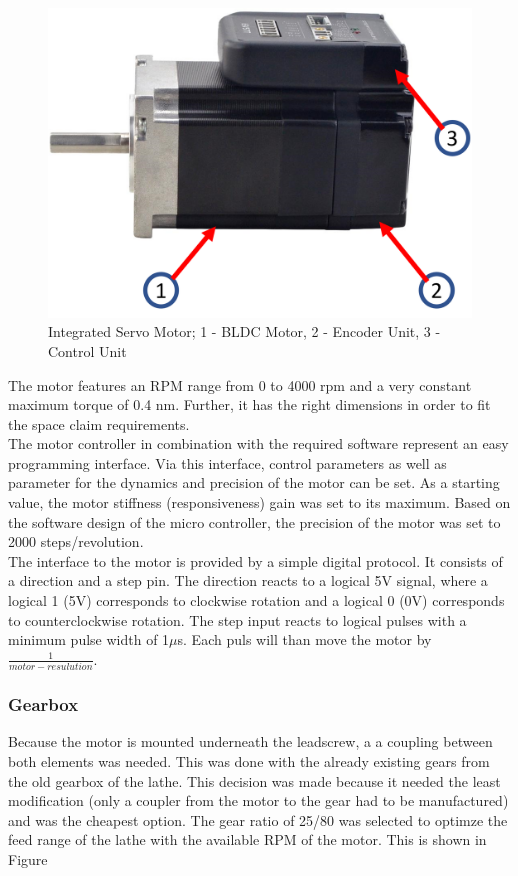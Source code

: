 \begin{figure}[h!]
    \begin{center}
    \includegraphics[width=12cm]{Pictures/IntegratedServo.png}
    \caption[Integrated Servo Motor]{Integrated Servo Motor; 1 - BLDC Motor, 2 - Encoder Unit, 3 - Control Unit}
    \label{Integrated Servo Motor}
    \end{center}
\end{figure}

The motor features an RPM range from 0 to 4000 rpm and a very constant maximum torque of 0.4 nm. Further, it has the right dimensions in order to fit the space claim requirements.\\
The motor controller in combination with the required software represent an easy programming interface. Via this interface, control parameters as well as parameter for the dynamics and precision of the motor can be set. As a starting value, the motor stiffness (responsiveness) gain was set to its maximum. Based on the software design of the micro controller, the precision of the motor was set to 2000 steps/revolution.\\
The interface to the motor is provided by a simple digital protocol. It consists of a direction and a step pin. The direction reacts to a logical 5V signal, where a logical 1 (5V) corresponds to clockwise rotation and a logical 0 (0V) corresponds to counterclockwise rotation. The step input reacts to logical pulses with a minimum pulse width of 1$\mu$s. Each puls will than move the motor by $\frac{1}{motor-resulution}$.

\subsubsection{Gearbox}
Because the motor is mounted underneath the leadscrew, a a coupling between both elements was needed. This was done with the already existing gears from the old gearbox of the lathe. This decision was made because it needed the least modification (only a coupler from the motor to the gear had to be manufactured) and was the cheapest option. The gear ratio of 25/80 was selected to optimze the feed range of the lathe with the available RPM of the motor. This is shown in Figure

